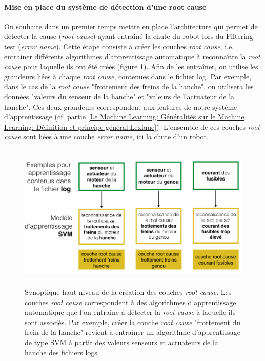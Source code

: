 \paragraph{Mise en place du système de détection d'une root cause}
On souhaite dans un premier temps mettre en place l'architecture qui permet de détecter la cause (\emph{root cause}) ayant entrainé la chute du robot lors du Filtering test (\emph{error name}). Cette étape consiste à créer les couches \emph{root cause}, i.e. entrainer différents algorithmes d'apprentissage automatique à reconnaître la \emph{root cause} pour laquelle ils ont été créés (figure \ref{fig:Creation des couches root cause}). Afin de les entraîner, on utilise les grandeurs liées à chaque \emph{root cause}, contenues dans le fichier log. Par exemple, dans le cas de la \emph{root cause} "frottement des freins de la hanche", on utilisera les données "valeurs du senseur de la hanche" et "valeurs de l'actuateur de la hanche". Ces deux grandeurs correspondent aux features de notre système d'apprentissage (cf. partie \ref{Le Machine Learning: Généralités sur le Machine Learning: Définition et principe général:Lexique}). L'ensemble de ces couches \emph{root cause} sont liées à une couche \emph{error name}, ici la chute d'un robot.

\begin{figure}[h]
	\centering\includegraphics[height=7cm]{images/synoptique_root.png}
	\caption[Création des couches root cause]{Synoptique haut niveau de la création des couches \emph{root cause}. Les couches \emph{root cause} correspondent à des algorithmes d'apprentissage automatique que l'on entraîne à détecter la \emph{root cause} à laquelle ils sont associés. Par exemple, créer la couche \emph{root cause} "frottement du frein de la hanche" revient à entraîner un algorithme d'apprentissage de type SVM à partir des valeurs senseurs et actuateurs de la hanche des fichiers logs.}
	\label{fig:Creation des couches root cause}
\end{figure}

